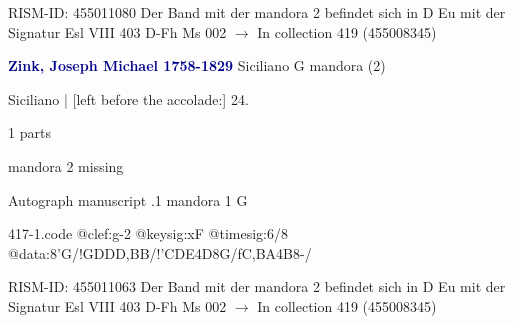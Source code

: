 \documentclass[twocolumn]{book}
\begin{document}
\newline RISM-ID: 455011080
\newline Der Band mit der mandora 2 befindet sich in D Eu mit der Signatur Esl VIII 403
\newline D-Fh  Ms 002
\newline $\rightarrow$ In collection 419 (455008345)

\newline \par \vspace{7pt} \textcolor{darkblue}{\textbf{Zink, Joseph Michael  1758-1829}}
\newline Siciliano  G  
\newline mandora (2)
\newline \begin{itshape}[f.16r, at left:] Siciliano | [left before the accolade:] 24.\end{itshape} 
\newline \textcolor{darkblue}{}  1 parts  
\newline \begin{small} mandora 2 missing\end{small} 
\newline Autograph manuscript
.1  mandora 1  G  
\begin{filecontents*}{417-1.code}
@clef:g-2
@keysig:xF
@timesig:6/8
@data:8'G/!GDDD,BB/!'CDE4D8G/fC,BA4B8-/
\end{filecontents*}
\newline
%

\newline RISM-ID: 455011063
\newline Der Band mit der mandora 2 befindet sich in D Eu mit der Signatur Esl VIII 403
\newline D-Fh  Ms 002
\newline $\rightarrow$ In collection 419 (455008345)
\end{document}
